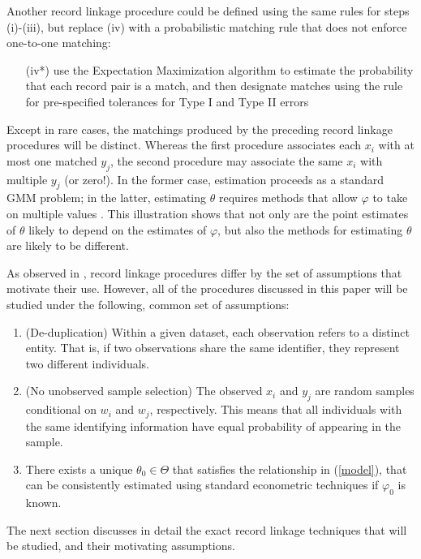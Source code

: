 \documentclass[12pt]{article}
\begin{document}
Another record linkage procedure could be defined using the same rules for steps (i)-(iii), but replace (iv) with a probabilistic matching rule that does not enforce one-to-one matching:
\begin{enumerate}
\item[(iv*)]  use the Expectation Maximization algorithm to estimate the probability that each record pair is a match, and then  designate matches using the \cite{fellegi69} rule for pre-specified tolerances for Type I and Type II errors 
\end{enumerate} 

Except in rare cases, the matchings produced by the preceding record linkage procedures will be distinct.  Whereas the first procedure associates each $x_i$ with at most one matched $y_j$, the second procedure may associate the same $x_i$ with multiple $y_j$ (or zero!).  In the former case, estimation proceeds as a standard GMM problem; in the latter, estimating $\theta$ requires methods that allow $\varphi$ to take on multiple values \citep{ahl2019}.  This illustration shows that not only are the point estimates of $\theta$ likely to depend on the estimates of $\varphi$, but also the methods for estimating $\theta$ are likely to be different. 

As observed in \cite{bailey2017}, record linkage procedures differ by the set of assumptions that motivate their use.  However, all of the procedures discussed in this paper will be studied under the following, common set of assumptions:
\begin{enumerate}
\item (De-duplication) Within a given dataset, each observation refers to a distinct entity.  That is, if two observations share the same identifier, they represent two different individuals.
\item (No unobserved sample selection) The observed $x_i$ and $y_j$ are random samples conditional on $w_i$ and $w_j$, respectively.  This means that all individuals with the same identifying information have equal probability of appearing in the sample. 
\item There exists a unique $\theta_0 \in \Theta$ that satisfies the relationship in (\ref{model}), that can be consistently estimated using standard econometric techniques if $\varphi_0$ is known.
\end{enumerate}

The next section discusses in detail the exact record linkage techniques that will be studied, and their motivating assumptions.

 

\end{document}
